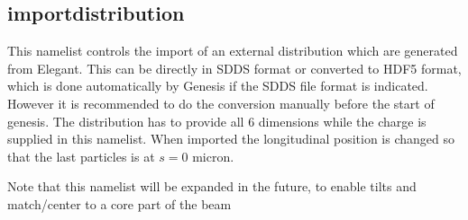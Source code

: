 \documentclass[12pt]{book}
\begin{document}
\subsection{\sf importdistribution}
This namelist controls the import of an external distribution which are generated from Elegant. This can be directly in SDDS format or converted to HDF5 format, which is done automatically by Genesis if the SDDS file format is indicated. However it is recommended to do the conversion manually before the start of genesis. The distribution has to provide all 6 dimensions while the charge is supplied in this namelist. When imported the longitudinal position is changed so that the last particles is at $s=0$ micron.

Note that this namelist will be expanded in the future, to enable tilts and match/center to a core part of the beam
\end{document}
